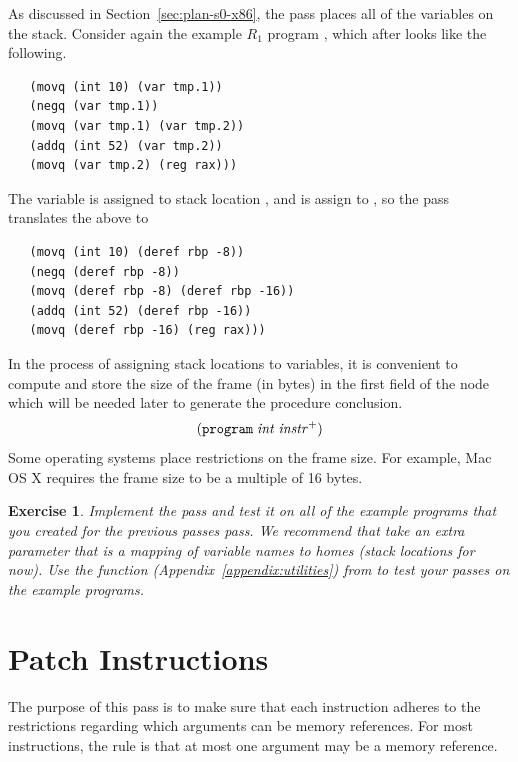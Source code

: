 \documentclass[11pt]{book}
\newtheorem{exercise}[theorem]{Exercise}
\begin{document}
As discussed in Section~\ref{sec:plan-s0-x86}, the
 pass places all of the variables on the stack.
Consider again the example $R_1$ program ,
which after  looks like the following.
\begin{lstlisting}
   (movq (int 10) (var tmp.1))
   (negq (var tmp.1))
   (movq (var tmp.1) (var tmp.2))
   (addq (int 52) (var tmp.2))
   (movq (var tmp.2) (reg rax)))
\end{lstlisting}
The variable  is assigned to stack location
, and  is assign to , so
the  pass translates the above to
\begin{lstlisting}
   (movq (int 10) (deref rbp -8))
   (negq (deref rbp -8))
   (movq (deref rbp -8) (deref rbp -16))
   (addq (int 52) (deref rbp -16))
   (movq (deref rbp -16) (reg rax)))
\end{lstlisting}

In the process of assigning stack locations to variables, it is
convenient to compute and store the size of the frame (in bytes) in
the first field of the  node which will be needed later
to generate the procedure conclusion.
\[
  (\texttt{program}\;\mathit{int}\;\mathit{instr}^{+})
\]
Some operating systems place restrictions on
the frame size. For example, Mac OS X requires the frame size to be a
multiple of 16 bytes.

\begin{exercise}
\normalfont Implement the  pass and test it on all
of the example programs that you created for the previous passes pass.
We recommend that  take an extra parameter that is a
mapping of variable names to homes (stack locations for now).  Use the
 function (Appendix~\ref{appendix:utilities}) from
 to test your passes on the example programs.
\end{exercise}

\section{Patch Instructions}
\label{sec:patch-s0}

The purpose of this pass is to make sure that each instruction adheres
to the restrictions regarding which arguments can be memory
references. For most instructions, the rule is that at most one
argument may be a memory reference.
\end{document}
